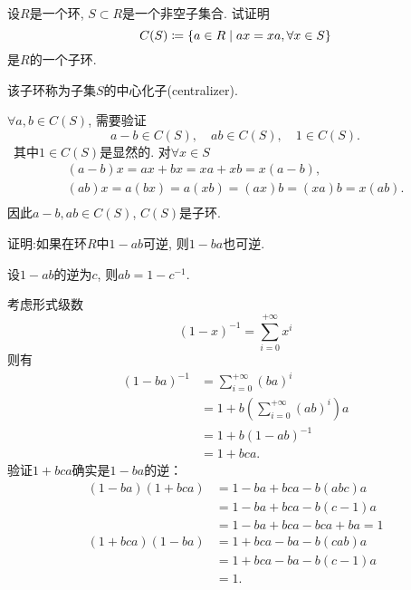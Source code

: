\begin{problem}
    设$R$是一个环, $S \subset R$是一个非空子集合. 试证明
\[
    C(S) \mathrel{\coloneqq} \{a \in R \mid ax = xa, \forall x \in S \}
\]
是$R$的一个子环.
\end{problem}

\begin{solution}
    该子环称为子集$S$的中心化子(centralizer).

    $\forall a, b \in C(S)$, 需要验证
    \[
        a - b \in C(S), \quad ab \in C(S), \quad 1 \in C(S).
    \]\
    其中$1 \in C(S)$是显然的.
    对$\forall x \in S$
    \[
    \begin{gathered}
        (a - b)x = ax + bx = xa + xb = x(a - b),\\
        (ab)x = a(bx) = a(xb) = (ax)b = (xa)b = x(ab).\\
    \end{gathered}
    \]
    因此$a - b, ab \in C(S)$, $C(S)$是子环.
\end{solution}

\begin{problem}\label{ex:1.2.5}
    证明:如果在环$R$中$1 - ab$可逆, 则$1 - ba$也可逆.
\end{problem}

\begin{solution}
    设$1 - ab$的逆为$c$, 则$ab = 1 - c^{-1}$.

    考虑形式级数
    \[
        (1 - x)^{-1} = \sum_{i = 0}^{+\infty} x^i
    \]
    则有
    \[
    \begin{aligned}
        (1 - ba)^{-1} &= \sum_{i = 0}^{+\infty} (ba)^i\\
        &= 1 + b\left(\sum_{i = 0}^{+\infty} (ab)^i\right)a\\
        &= 1 + b(1 - ab)^{-1}\\
        &= 1 + bca.
    \end{aligned} 
    \]
    验证$1 + bca$确实是$1 - ba$的逆：
    \[
    \begin{aligned}
        (1 - ba)(1 + bca) &= 1 - ba + bca - b(abc)a\\
        &= 1 - ba + bca -b(c - 1)a\\
        &= 1 - ba + bca -bca + ba = 1\\
        (1 + bca)(1 - ba) &= 1 + bca - ba - b(cab)a\\
        &= 1 + bca - ba - b(c - 1)a\\
        &= 1.
    \end{aligned}
    \]
\end{solution}

